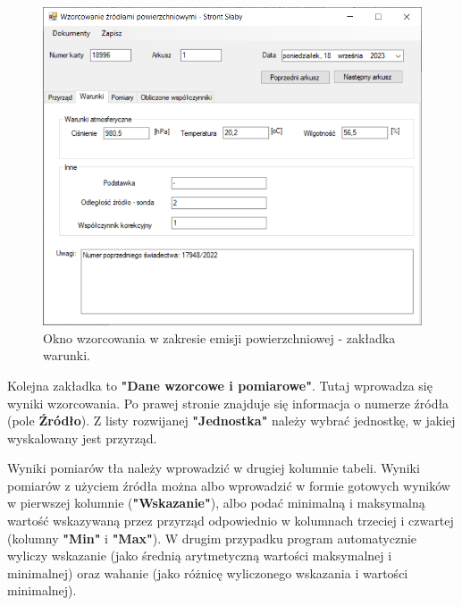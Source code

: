 	\begin{figure}[htb]
		\centering
		\includegraphics[width=\columnwidth]{obrazki/Wzorcowanie/emisja/warunki.png}
		\caption{Okno wzorcowania w zakresie emisji powierzchniowej - zakładka warunki.}
		\label{emisjaWarunki}
	\end{figure}
	
	Kolejna zakładka to \textbf{"Dane wzorcowe i pomiarowe"}. Tutaj wprowadza się wyniki wzorcowania. Po prawej stronie znajduje się informacja o numerze źródła (pole \textbf{Źródło}).	Z listy rozwijanej \textbf{"Jednostka"} należy wybrać jednostkę, w jakiej wyskalowany jest przyrząd.
	
	Wyniki pomiarów tła należy wprowadzić w drugiej kolumnie tabeli. Wyniki pomiarów z użyciem źródła można albo wprowadzić w formie gotowych wyników w pierwszej kolumnie (\textbf{"Wskazanie"}), albo podać minimalną i maksymalną wartość wskazywaną przez przyrząd odpowiednio w kolumnach trzeciej i czwartej (kolumny \textbf{"Min"} i \textbf{"Max"}). W drugim przypadku program automatycznie wyliczy wskazanie (jako średnią arytmetyczną wartości maksymalnej i minimalnej) oraz wahanie (jako różnicę wyliczonego wskazania i wartości minimalnej).
	
